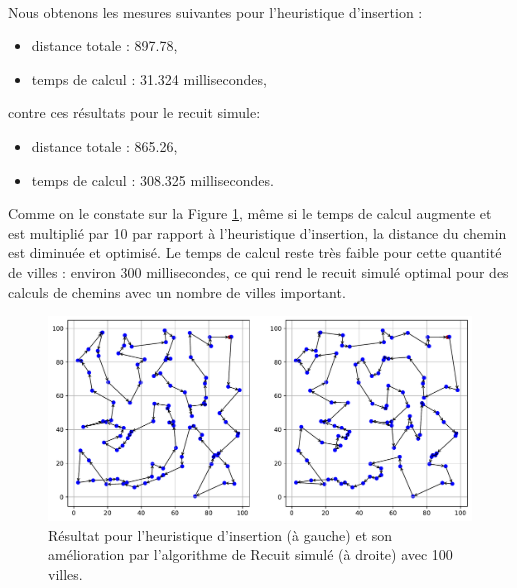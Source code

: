 \documentclass[a4paper,11pt,fleqn]{article}
\begin{document}
\paragraph{}
Nous obtenons les mesures suivantes pour l'heuristique d'insertion : 
\begin{itemize}[noitemsep,topsep=5pt]
    \item distance totale : 897.78,
    \item temps de calcul : 31.324 millisecondes,
\end{itemize} 
contre ces résultats pour le recuit simule:
\begin{itemize}[noitemsep,topsep=5pt]
    \item distance totale : 865.26,
    \item temps de calcul : 308.325 millisecondes.
\end{itemize}
Comme on le constate sur la Figure \ref{fig:recuit}, même si le temps de calcul augmente et est multiplié par 10 par rapport à l'heuristique d'insertion, la distance du chemin est diminuée et optimisé. Le temps de calcul reste très faible pour cette quantité de villes : environ 300 millisecondes, ce qui rend le recuit simulé optimal pour des calculs de chemins avec un nombre de villes important.
\begin{figure}[H]
    \centering
    \includegraphics[width=\textwidth]{images/recuit_simule.pdf}
    \caption{Résultat pour l'heuristique d'insertion (à gauche) et son amélioration par l'algorithme de Recuit simulé (à droite) avec 100 villes.}
    \label{fig:recuit}
\end{figure}
\end{document}
